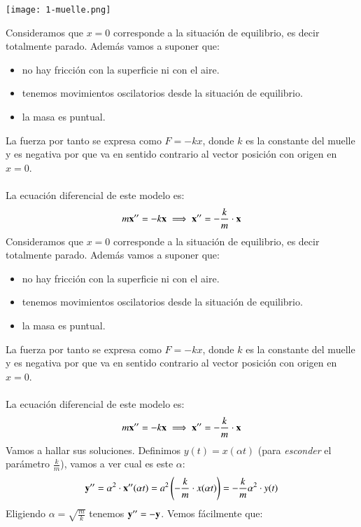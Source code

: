\begin{eg}[Muelles]\label{eg:muelle}
      \begin{center}
        \texttt{[image: 1-muelle.png]}
      \end{center}
        Consideramos que $x=0$ corresponde a la situación de equilibrio, es decir totalmente parado. Además vamos a suponer que:
        \begin{itemize}
            \item no hay fricción con la superficie ni con el aire.
            \item tenemos movimientos oscilatorios desde la situación de equilibrio.
            \item la masa es puntual.
        \end{itemize}
        La fuerza por tanto se expresa como $F = -k x$, donde $k$ es la constante del muelle y es negativa por que va en sentido contrario al vector posición con origen en $x=0$.\\\\
        La ecuación diferencial de este modelo es:
        $$
            m\mathbf{x}'' = -k \mathbf{x} \implies \mathbf{x}'' = -\frac{k}{m}\cdot \mathbf{x}
        $$
    Consideramos que $x=0$ corresponde a la situación de equilibrio, es decir totalmente parado. Además vamos a suponer que:
    \begin{itemize}
        \item no hay fricción con la superficie ni con el aire.
        \item tenemos movimientos oscilatorios desde la situación de equilibrio.
        \item la masa es puntual.
    \end{itemize}
    La fuerza por tanto se expresa como $F = -k x$, donde $k$ es la constante del muelle y es negativa por que va en sentido contrario al vector posición con origen en $x=0$.\\\\
    La ecuación diferencial de este modelo es:
    $$
        m\mathbf{x}'' = -k \mathbf{x} \implies \mathbf{x}'' = -\frac{k}{m}\cdot \mathbf{x}
    $$
    Vamos a hallar sus soluciones. Definimos $y(t) = x(\alpha t)$ (para \textit{esconder} el parámetro $\frac{k}{m}$), vamos a ver cual es este $\alpha$:
    $$
    \mathbf{y}'' = \alpha^2\cdot \mathbf{x}''(\alpha t) = a^2\left(-\frac{k}{m}\cdot x(\alpha t)\right) = -\frac{k}{m} \alpha ^2\cdot y(t)
    $$
    Eligiendo $\alpha = \sqrt{\frac{m}{k}}$ tenemos $\mathbf{y}'' = -\mathbf{y}$. Vemos fácilmente que:\\\\

\end{eg}
